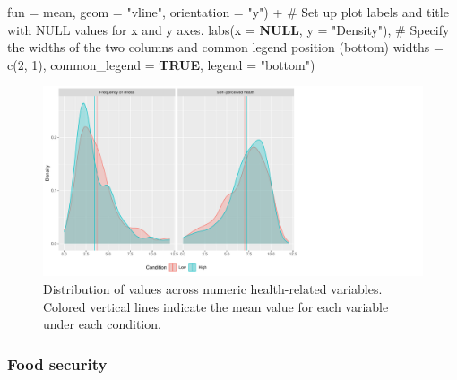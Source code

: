 \documentclass[
  bookmarksnumbered]{article}
\newenvironment{Shaded}{\begin{snugshade}}{\end{snugshade}}
\newcommand{\AttributeTok}[1]{\textcolor[rgb]{0.80,0.80,0.80}{#1}}
\newcommand{\CommentTok}[1]{\textcolor[rgb]{0.50,0.62,0.50}{#1}}
\newcommand{\ConstantTok}[1]{\textcolor[rgb]{0.86,0.64,0.64}{\textbf{#1}}}
\newcommand{\DecValTok}[1]{\textcolor[rgb]{0.86,0.86,0.80}{#1}}
\newcommand{\FunctionTok}[1]{\textcolor[rgb]{0.94,0.94,0.56}{#1}}
\newcommand{\NormalTok}[1]{\textcolor[rgb]{0.80,0.80,0.80}{#1}}
\newcommand{\SpecialCharTok}[1]{\textcolor[rgb]{0.86,0.64,0.64}{#1}}
\newcommand{\StringTok}[1]{\textcolor[rgb]{0.80,0.58,0.58}{#1}}
\begin{document}
\begin{Shaded}
\begin{Highlighting}[]
                 \AttributeTok{fun =}\NormalTok{ mean, }\AttributeTok{geom =} \StringTok{"vline"}\NormalTok{, }\AttributeTok{orientation =} \StringTok{"y"}\NormalTok{) }\SpecialCharTok{+}
    \CommentTok{\# Set up plot labels and title with NULL values for x and y axes.}
    \FunctionTok{labs}\NormalTok{(}\AttributeTok{x =} \ConstantTok{NULL}\NormalTok{, }\AttributeTok{y =} \StringTok{"Density"}\NormalTok{),}
  \CommentTok{\# Specify the widths of the two columns and common legend position (bottom)}
  \AttributeTok{widths =} \FunctionTok{c}\NormalTok{(}\DecValTok{2}\NormalTok{, }\DecValTok{1}\NormalTok{),}
  \AttributeTok{common\_legend =} \ConstantTok{TRUE}\NormalTok{,}
  \AttributeTok{legend =} \StringTok{"bottom"}\NormalTok{)}
\end{Highlighting}
\end{Shaded}

\begin{figure}
\centering
\includegraphics{Supplementary_material_files/figure-latex/health-desc-plot-1.pdf}
\caption{\label{fig:health-desc-plot}Distribution of values across numeric health-related variables. Colored vertical lines indicate the mean value for each variable under each condition.}
\end{figure}

\subsubsection{Food security}\label{food-security}
\end{document}

